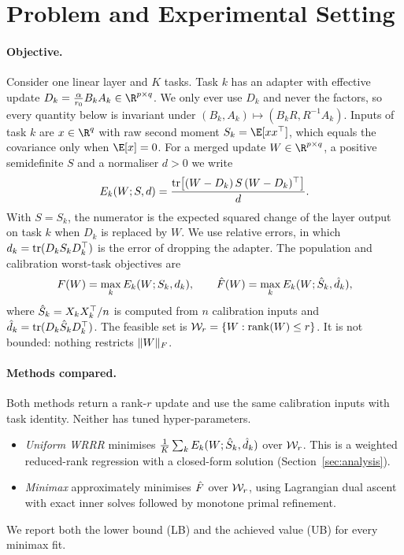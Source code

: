 \section{Problem and Experimental Setting}
\label{sec:setting}

\paragraph{Objective.} Consider one linear layer and $K$ tasks. Task $k$ has an adapter with
effective update $D_k=\tfrac{\alpha}{r_0}B_kA_k\in\R^{p\times q}$. We only ever use $D_k$ and
never the factors, so every quantity below is invariant under $(B_k,A_k)\mapsto(B_kR,R^{-1}A_k)$.
Inputs of task $k$ are $x\in\R^q$ with raw second moment $S_k=\E[xx^\top]$, which equals the
covariance only when $\E[x]=0$. For a merged update $W\in\R^{p\times q}$, a positive semidefinite
$S$ and a normaliser $d>0$ we write
\begin{equation}
E_k(W;S,d)=\frac{\operatorname{tr}\!\big[(W-D_k)\,S\,(W-D_k)^\top\big]}{d}.
\label{eq:error}
\end{equation}
With $S=S_k$, the numerator is the expected squared change of the layer output on task $k$ when
$D_k$ is replaced by $W$. We use relative errors, in which $d_k=\operatorname{tr}(D_kS_kD_k^\top)$ is the error
of dropping the adapter. The population and calibration worst-task objectives are
\begin{equation}
F(W)=\max_k E_k(W;S_k,d_k),\qquad \hat{F}(W)=\max_k E_k(W;\hat{S}_k,\hat{d}_k),
\label{eq:objectives}
\end{equation}
where $\hat{S}_k=X_kX_k^\top/n$ is computed from $n$ calibration inputs and
$\hat{d}_k=\operatorname{tr}(D_k\hat{S}_kD_k^\top)$. The feasible set is $\mathcal{W}_r=\{W:\operatorname{rank}(W)\le r\}$. It is not
bounded: nothing restricts $\lVert W\rVert_{F}$.

\paragraph{Methods compared.} Both methods return a rank-$r$ update and use the same calibration
inputs with task identity. Neither has tuned hyper-parameters.
\begin{itemize}
\item \emph{Uniform WRRR} minimises $\frac1K\sum_k E_k(W;\hat{S}_k,\hat{d}_k)$ over $\mathcal{W}_r$. This is a
weighted reduced-rank regression with a closed-form solution (Section~\ref{sec:analysis}).
\item \emph{Minimax} approximately minimises $\hat{F}$ over $\mathcal{W}_r$, using Lagrangian dual ascent with
exact inner solves followed by monotone primal refinement.
\end{itemize}
We report both the lower bound (LB) and the achieved value (UB) for every minimax fit.

